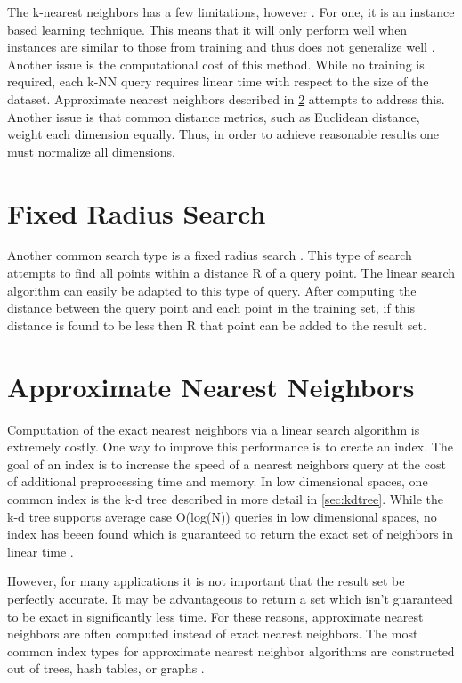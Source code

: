The k-nearest neighbors has a few limitations, however \citep{beyer1999nearest}.  For one, it is an instance based learning technique.  This means that it will only perform well when instances are similar to those from training and thus does not generalize well \citep{aha1991instance}.  Another issue is the computational cost of this method.  While no training is required, each k-NN query requires linear time with respect to the size of the dataset.  Approximate nearest neighbors described in \ref{sec:ann} attempts to address this.  Another issue is that common distance metrics, such as Euclidean distance, weight each dimension equally.  Thus, in order to achieve reasonable results one must normalize all dimensions.

\section{Fixed Radius Search}

Another common search type is a fixed radius search \citep{dickerson1990fixed}.  This type of search attempts to find all points within a distance R of a query point.  The linear search algorithm can easily be adapted to this type of query.  After computing the distance between the query point and each point in the training set, if this distance is found to be less then R that point can be added to the result set.

\section{Approximate Nearest Neighbors}
\label{sec:ann}

Computation of the exact nearest neighbors via a linear search algorithm is extremely costly.  One way to improve this performance is to create an index.  The goal of an index is to increase the speed of a nearest neighbors query at the cost of additional preprocessing time and memory.  In low dimensional spaces, one common index is the k-d tree described in more detail in \ref{sec:kdtree}.  While the k-d tree supports average case O(log(N)) queries in low dimensional spaces, no index has beeen found which is guaranteed to return the exact set of neighbors in linear time \citep{muja_flann_2009}.

However, for many applications it is not important that the result set be perfectly accurate.  It may be advantageous to return a set which isn't guaranteed to be exact in significantly less time. For these reasons, approximate nearest neighbors are often computed instead of exact nearest neighbors.  The most common index types for approximate nearest neighbor algorithms are constructed out of trees, hash tables, or graphs \citep{flann_pami_2014}.

